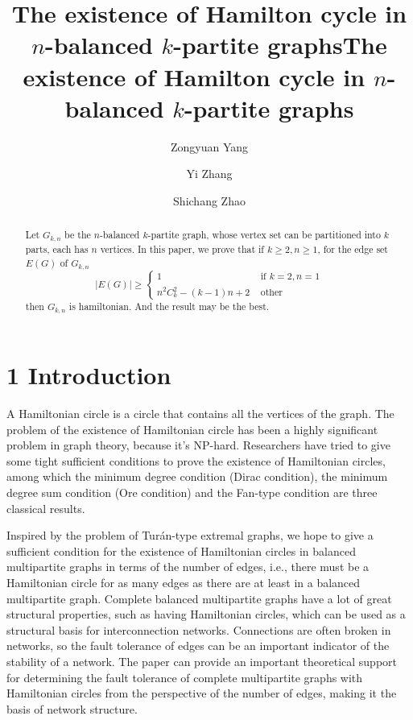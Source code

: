 \documentclass[reqno]{amsart}
\title
  {The existence of Hamilton cycle in $n$-balanced $k$-partite graphs}
\author{Zongyuan Yang}
\author{Yi Zhang}
\author{Shichang Zhao}
\date{}
\begin{document}
\title{The existence of Hamilton cycle in $n$-balanced $k$-partite graphs}

\begin{abstract}
 Let $G_{k,n}$ be the $n$-balanced $k$-partite graph, whose vertex set can be partitioned into $k$ parts, each has $n$ vertices. In this paper, we prove that if $k \geq 2,n \geq 1$, for the edge set $E(G)$ of $G_{k,n}$
 $$|E(G)| \geq\left\{\begin{array}{cc}
   1                         & \text { if } k=2, n=1 \\
   n^{2} C_{k}^{2}-(k-1) n+2 & \text { other }
  \end{array}\right.$$
 then $G_{k,n}$ is hamiltonian. And the result may be the best.
\end{abstract}

\maketitle

\section{1 \quad Introduction}

\quad A Hamiltonian circle is a circle that contains all the vertices of the graph. The problem of the existence of Hamiltonian circle has been a highly  significant problem in graph theory, because it's NP-hard. Researchers have tried to give some tight sufficient conditions to prove the existence of Hamiltonian circles, among which the minimum degree condition (Dirac condition), the minimum degree sum condition (Ore condition) and the Fan-type condition are three classical results.

Inspired by the problem of Turán-type extremal graphs, we hope to give a sufficient condition for the existence of Hamiltonian circles in balanced multipartite graphs in terms of the number of edges, i.e., there must be a Hamiltonian circle for as many edges as there are at least in a balanced multipartite graph. Complete balanced multipartite graphs have a lot of great structural properties, such as having Hamiltonian circles, which can be used as a structural basis for interconnection networks. Connections are often broken in networks, so the fault tolerance of edges can be an important indicator of the stability of a network. The paper can provide an important theoretical support for determining the fault tolerance of complete multipartite graphs with Hamiltonian circles from the perspective of the number of edges, making it the basis of network structure.
\end{document}
